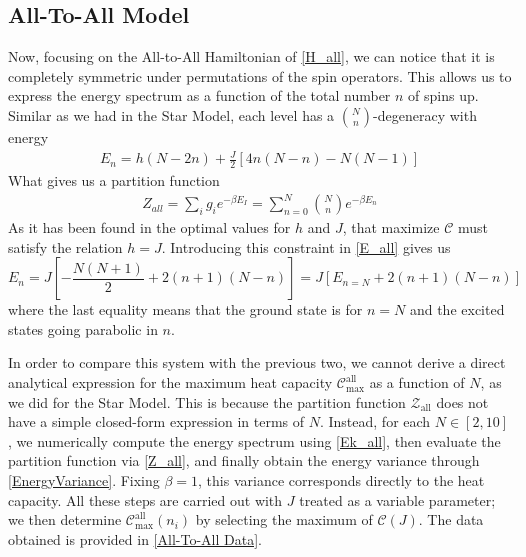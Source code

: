 \subsection{All-To-All Model}
Now, focusing on the All-to-All Hamiltonian of \eqref{H_all}, we can notice that it is completely symmetric under permutations of the spin operators. This allows us to express the energy spectrum as a function of the total number $n$ of spins up. Similar as we had in the Star Model, each level has a $\binom{N}{n}$-degeneracy with energy
\begin{align}
    E_n=h(N-2n)+\frac{J}{2}[4n(N-n)-N(N-1)]
    \label{E_all}
\end{align}
What gives us a partition function
\begin{align}
    Z_{all}=\sum_ig_ie^{-\beta E_I}=\sum_{n=0}^N\binom{N}{n}e^{-\beta E_n}
    \label{Z_all}
\end{align}
As it has been found in \cite{abiuso2022optimal} the optimal values for $h$ and $J$, that maximize $\mathcal{C}$ must satisfy the relation $h=J$. Introducing this constraint in \eqref{E_all} gives us
\begin{equation}
    E_n=J\left[-\frac{N(N+1)}{2}+2(n+1)(N-n)\right] =J\left[ E_{n=N}+2(n+1)(N-n)\right]
    \label{Ek_all}
\end{equation}
where the last equality means that the ground state is for $n=N$ and the excited states going parabolic in $n$.\par
In order to compare this system with the previous two, we cannot derive a direct analytical expression for the maximum heat capacity $\mathcal{C}_{\text{max}}^{\text{all}}$ as a function of $N$, as we did for the Star Model. This is because the partition function $\mathcal{Z}_{\text{all}}$ does not have a simple closed-form expression in terms of $N$. Instead, for each $N \in [2, 10]$, we numerically compute the energy spectrum using \eqref{Ek_all}, then evaluate the partition function via \eqref{Z_all}, and finally obtain the energy variance through \eqref{EnergyVariance}. Fixing $\beta = 1$, this variance corresponds directly to the heat capacity. All these steps are carried out with $J$ treated as a variable parameter; we then determine $\mathcal{C}_{\text{max}}^{\text{all}}(n_i)$ by selecting the maximum of $\mathcal{C}(J)$. The data obtained is provided in \ref{All-To-All Data}.

